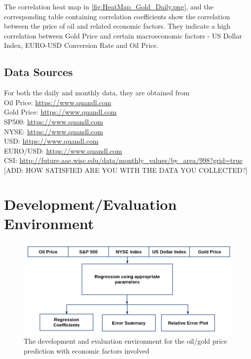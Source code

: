 \documentclass[runningheads]{llncs}
\begin{document}
The correlation heat map in \autoref{fig:HeatMap_Gold_Daily.png}, and the corresponding table containing correlation coefficients show the correlation between the price of oil and related economic factors. They indicate a high correlation between Gold Price and certain macroeconomic factors - US Dollar Index, EURO-USD Conversion Rate and Oil Price.


\subsection{Data Sources}
\noindent For both the daily and monthly data, they are obtained from \\
Oil Price: \url{https://www.quandl.com} \\ 
Gold Price: \url{https://www.quandl.com} \\
SP500: \url{https://www.quandl.com} \\
NYSE: \url{https://www.quandl.com} \\
USD: \url{https://www.quandl.com} \\
EURO/USD: \url{https://www.quandl.com} \\
CSI: \url{http://future.aae.wisc.edu/data/monthly_values/by_area/998?grid=true} \\

[ADD: HOW SATISFIED ARE YOU WITH THE DATA YOU COLLECTED?]

\newpage
\section{Development/Evaluation Environment}

\begin{figure}
\centering
\includegraphics[width=\textwidth]{DevelopmentFlowchart.png}
\caption{The development and evaluation environment for the oil/gold price prediction with economic factors involved}
\label{fig:DevelopmentFlowchart.png}
\end{figure}
\end{document}
